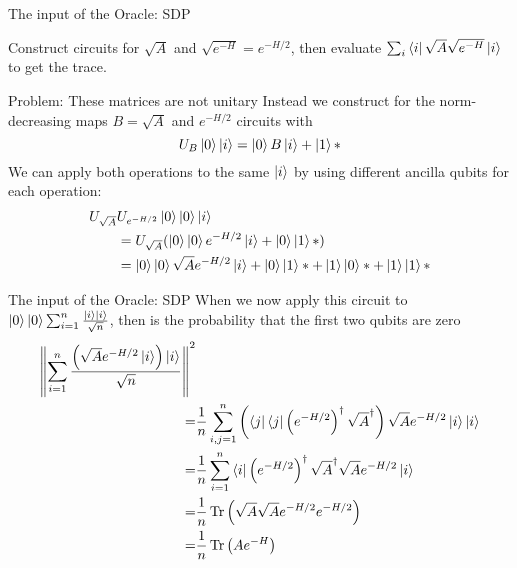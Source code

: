 \begin{frame}{The input of the Oracle: SDP}

 Construct circuits for $\sqrt{A}$ and $\sqrt{e^{-H}}=e^{-H/2}$, then evaluate $\sum_i \bra{i}\sqrt{A}\sqrt{e^{-H}}\ket{i}$ to get the trace.

\begin{block}{Problem: These matrices are not unitary}
Instead we construct for the norm-decreasing maps $B=\sqrt{A}$ and $e^{-H/2}$ circuits with
\begin{equation*}
U_B\ket{0}\ket{i}=\ket{0}B\ket{i}+\ket{1}*
\end{equation*}
\pause
We can apply both operations to the same $\ket{i}$ by using different ancilla qubits for each operation:
\begin{align*}
U_{\sqrt{A}}&U_{e^{-H/2}}\ket{0}\ket{0}\ket{i}\\
&=U_{\sqrt{A}}(\ket{0}\ket{0}e^{-H/2}\ket{i}+\ket{0}\ket{1}*)\\
&=\ket{0}\ket{0}\sqrt{A}e^{-H/2}\ket{i}+\ket{0}\ket{1}*+\ket{1}\ket{0}*+\ket{1}\ket{1}*
\end{align*}
\end{block}

\end{frame}

\begin{frame}{The input of the Oracle: SDP}
When we now apply this circuit to $\ket{0}\ket{0}\sum_{i=1}^n \frac{\ket{i}\ket{i}}{\sqrt{n}}$, then is the probability that the first two qubits are zero
\begin{align*}
\left\|\sum_{i=1}^n\frac{\left(\sqrt{A}e^{-H/2}\ket{i}\right)\ket{i}}{\sqrt{n}} \right\|^2 & \\ 
=&\frac 1 n \sum_{i,j=1}^n \left( \bra{j}\bra{j}\left(e^{-H/2}\right)^\dagger\sqrt{A}^\dagger\right)\sqrt{A}e^{-H/2}\ket{i}\ket{i} \\
=&\frac{1}{n}\sum_{i=1}^n \bra{i}\left(e^{-H/2}\right)^\dagger\sqrt{A}^\dagger\sqrt{A}e^{-H/2}\ket{i}\\
=&\frac{1}{n}\operatorname{Tr}\left(\sqrt{A}\sqrt{A}e^{-H/2}e^{-H/2}\right)\\
=&\frac{1}{n}\operatorname{Tr}\left(Ae^{-H}\right)
\end{align*}
\end{frame}


